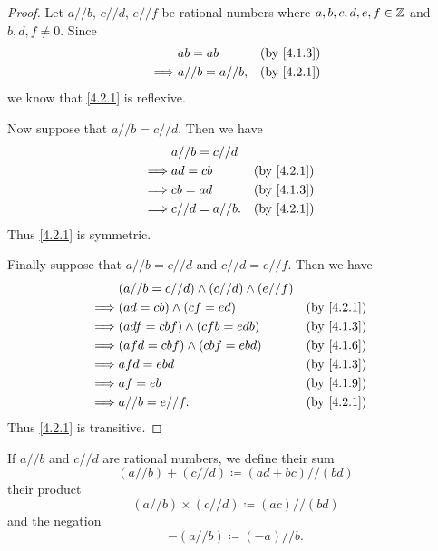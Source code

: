 \begin{proof}
  Let \(a // b\), \(c // d\), \(e // f\) be rational numbers where \(a, b, c, d, e, f \in \mathbb{Z}\) and \(b, d, f \neq 0\).
  Since
  \begin{align*}
             & ab = ab          &  & \text{(by \cref{4.1.3})} \\
    \implies & a // b = a // b, &  & \text{(by \cref{4.2.1})}
  \end{align*}
  we know that \cref{4.2.1} is reflexive.

  Now suppose that \(a // b = c // d\).
  Then we have
  \begin{align*}
             & a // b = c // d                                \\
    \implies & ad = cb          &  & \text{(by \cref{4.2.1})} \\
    \implies & cb = ad          &  & \text{(by \cref{4.1.3})} \\
    \implies & c // d = a // b. &  & \text{(by \cref{4.2.1})}
  \end{align*}
  Thus \cref{4.2.1} is symmetric.

  Finally suppose that \(a // b = c // d\) and \(c // d = e // f\).
  Then we have
  \begin{align*}
             & (a // b = c // d) \land (c // d) \land (e // f)                               \\
    \implies & (ad = cb) \land (cf = ed)                       &  & \text{(by \cref{4.2.1})} \\
    \implies & (adf = cbf) \land (cfb = edb)                   &  & \text{(by \cref{4.1.3})} \\
    \implies & (afd = cbf) \land (cbf = ebd)                   &  & \text{(by \cref{4.1.6})} \\
    \implies & afd = ebd                                       &  & \text{(by \cref{4.1.3})} \\
    \implies & af = eb                                         &  & \text{(by \cref{4.1.9})} \\
    \implies & a // b = e // f.                                &  & \text{(by \cref{4.2.1})}
  \end{align*}
  Thus \cref{4.2.1} is transitive.
\end{proof}

\begin{defn}\label{4.2.2}
  If \(a // b\) and \(c // d\) are rational numbers, we define their sum
  \[
    (a // b) + (c // d) \coloneqq (ad + bc) // (bd)
  \]
  their product
  \[
    (a // b) \times (c // d) \coloneqq (ac) // (bd)
  \]
  and the negation
  \[
    -(a // b) \coloneqq (-a) // b.
  \]
\end{defn}

